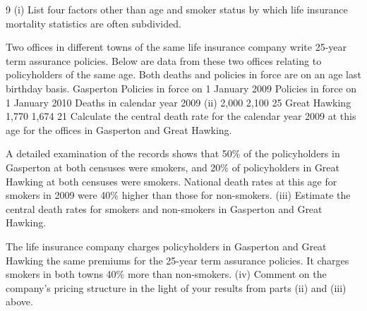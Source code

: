 \documentclass[a4paper,12pt]{article}
\begin{document}
\begin{enumerate}
[Total 10]9
(i)
List four factors other than age and smoker status by which life insurance
mortality statistics are often subdivided.

Two offices in different towns of the same life insurance company write 25-year term
assurance policies. Below are data from these two offices relating to policyholders of
the same age. Both deaths and policies in force are on an age last birthday basis.
Gasperton
Policies in force on 1 January 2009
Policies in force on 1 January 2010
Deaths in calendar year 2009
(ii)
2,000
2,100
25
Great Hawking
1,770
1,674
21
Calculate the central death rate for the calendar year 2009 at this age for the
offices in Gasperton and Great Hawking.

A detailed examination of the records shows that 50\% of the policyholders in
Gasperton at both censuses were smokers, and 20\% of policyholders in Great
Hawking at both censuses were smokers. National death rates at this age for smokers
in 2009 were 40\% higher than those for non-smokers.
(iii)
Estimate the central death rates for smokers and non-smokers in Gasperton
and Great Hawking.

The life insurance company charges policyholders in Gasperton and Great Hawking
the same premiums for the 25-year term assurance policies. It charges smokers in
both towns 40\% more than non-smokers.
(iv)
Comment on the company’s pricing structure in the light of your results from
parts (ii) and (iii) above.




\end{enumerate}
\end{document}
